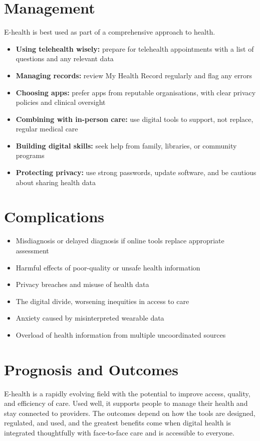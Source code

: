 \section*{Management}
E-health is best used as part of a comprehensive approach to health.
\begin{itemize}
    \item \textbf{Using telehealth wisely:} prepare for telehealth appointments with a list of questions and any relevant data
    \item \textbf{Managing records:} review My Health Record regularly and flag any errors
    \item \textbf{Choosing apps:} prefer apps from reputable organisations, with clear privacy policies and clinical oversight
    \item \textbf{Combining with in-person care:} use digital tools to support, not replace, regular medical care
    \item \textbf{Building digital skills:} seek help from family, libraries, or community programs
    \item \textbf{Protecting privacy:} use strong passwords, update software, and be cautious about sharing health data
\end{itemize}

\section*{Complications}
\begin{itemize}
    \item Misdiagnosis or delayed diagnosis if online tools replace appropriate assessment
    \item Harmful effects of poor-quality or unsafe health information
    \item Privacy breaches and misuse of health data
    \item The digital divide, worsening inequities in access to care
    \item Anxiety caused by misinterpreted wearable data
    \item Overload of health information from multiple uncoordinated sources
\end{itemize}

\section*{Prognosis and Outcomes}
E-health is a rapidly evolving field with the potential to improve access, quality, and efficiency of care. Used well, it supports people to manage their health and stay connected to providers. The outcomes depend on how the tools are designed, regulated, and used, and the greatest benefits come when digital health is integrated thoughtfully with face-to-face care and is accessible to everyone.

